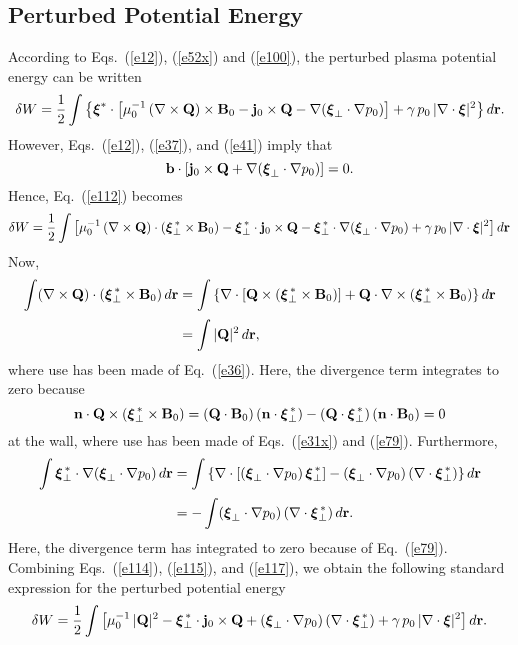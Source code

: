 \documentclass[12pt,prb,aps,notitlepage]{revtex4-1}
\newcommand{\bxi}{\mbox{\boldmath$\xi$}}
\begin{document}
\subsection{Perturbed Potential Energy}
According to Eqs.~(\ref{e12}), (\ref{e52x}) and (\ref{e100}), the perturbed plasma potential energy can be written
\begin{equation}\label{e112}
\delta W =\frac{1}{2}\int\left\{\bxi^\ast\cdot\left[\mu_0^{-1}\,(\nabla\times {\bf Q})\times {\bf B}_0 - {\bf j}_0\times {\bf Q} -\nabla(\bxi_\perp\cdot\nabla p_0)\right]
+\gamma\,p_0\,|\nabla\cdot\bxi|^2\right\}d{\bf r}.
\end{equation}
However, Eqs.~(\ref{e12}), (\ref{e37}), and (\ref{e41}) imply that 
\begin{equation}
{\bf b}\cdot [{\bf j}_0\times {\bf Q} +\nabla(\bxi_\perp\cdot\nabla p_0)]= 0.
\end{equation}
Hence, Eq.~(\ref{e112}) becomes
\begin{equation}\label{e114}
\delta W = \frac{1}{2}\int\left[\mu_0^{-1}\,(\nabla\times {\bf Q})\cdot(\bxi_\perp^{\,\ast}\times {\bf B}_0) - \bxi_\perp^{\,\ast}\cdot{\bf j}_0\times {\bf Q}
- \bxi_\perp^{\,\ast}\cdot\nabla(\bxi_\perp\cdot\nabla p_0)+\gamma\,p_0\,|\nabla\cdot\bxi|^2\right]d{\bf r}
\end{equation}
Now,
\begin{align}\label{e115}
\int (\nabla\times {\bf Q})\cdot(\bxi_\perp^{\,\ast}\times {\bf B}_0) \,d{\bf r}&=\int\left\{\nabla\cdot[{\bf Q}\times(\bxi_\perp^{\,\ast}\times {\bf B}_0)]
+{\bf Q}\cdot\nabla\times(\bxi_\perp^{\,\ast}\times {\bf B}_0)\right\}d{\bf r}\nonumber\\[0.5ex]
&=\int |{\bf Q}|^2\,d{\bf r},
\end{align}
where use has been made of Eq.~(\ref{e36}). Here, the divergence term integrates to zero because
\begin{equation}
{\bf n}\cdot {\bf Q}\times(\bxi_\perp^{\,\ast}\times {\bf B}_0)= ({\bf Q}\cdot{\bf B}_0)\,({\bf n}\cdot\bxi_\perp^{\,\ast})- ({\bf Q}\cdot\bxi_\perp^{\,\ast})\,({\bf n}\cdot{\bf B}_0)
=0
\end{equation}
at the wall, where use has been made of Eqs.~(\ref{e31x}) and (\ref{e79}). Furthermore, 
\begin{align}\label{e117}
\int \bxi_\perp^{\,\ast}\cdot\nabla(\bxi_\perp\cdot\nabla p_0)\,d{\bf r} &= \int\left\{\nabla\cdot[(\bxi_\perp\cdot\nabla p_0)\,\bxi_\perp^{\,\ast}]
-(\bxi_\perp\cdot \nabla p_0)\,(\nabla\cdot\bxi_\perp^{\,\ast})\right\}d{\bf r}\nonumber\\[0.5ex]
&= -\int (\bxi_\perp\cdot \nabla p_0)\,(\nabla\cdot\bxi_\perp^{\,\ast})\,d{\bf r}.
\end{align}
Here, the divergence term has integrated to zero because of Eq.~(\ref{e79}). Combining Eqs.~(\ref{e114}), (\ref{e115}), and (\ref{e117}),
we obtain the following standard expression for the perturbed potential energy
\begin{equation}
\delta W = \frac{1}{2}\int\left[\mu_0^{-1}\,|{\bf Q}|^2 - \bxi_\perp^{\,\ast}\cdot{\bf j}_0\times {\bf Q} + (\bxi_\perp\cdot\nabla p_0)\,(\nabla\cdot\bxi_\perp^{\,\ast})
+ \gamma\,p_0\,|\nabla\cdot\bxi|^2\right]d{\bf r}.
\end{equation}
\end{document}
